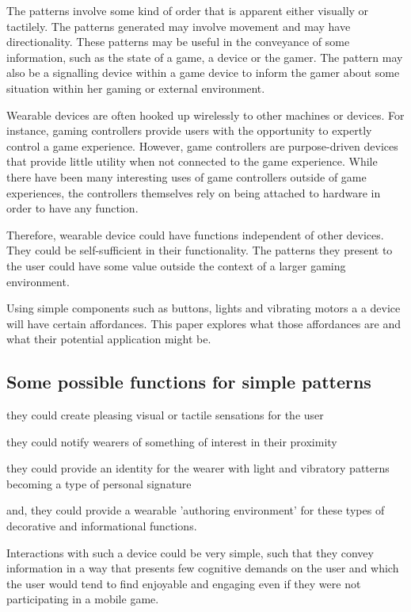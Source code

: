 \documentclass{chi-ext}
\begin{document}
The patterns involve some kind of order that is apparent either visually or tactilely. The patterns generated may involve movement and may have directionality. These patterns may be useful in the conveyance of some information, such as the state of a game, a device or the gamer. The pattern may also be a signalling device within a game device to inform the gamer about some situation within her gaming or external environment.

Wearable devices are often hooked up wirelessly to other machines or devices. For instance, gaming controllers provide users with the opportunity to expertly control a game experience. However, game controllers are purpose-driven devices that provide little utility when not connected to the game experience. While there have been many interesting uses of game controllers outside of game experiences, the controllers themselves rely on being attached to hardware in order to have any function. 

Therefore, wearable device could have functions independent of other devices. They could be self-sufficient in their functionality. The patterns they present to the user could have some value outside the context of a larger gaming environment. 

Using simple components such as buttons, lights and vibrating motors a a device will have certain affordances. This paper explores what those affordances are and what their potential application might be. 

\subsection{Some possible functions for simple patterns}
\begin{inparaenum}
\item they could create pleasing visual or tactile sensations for the user
\item they could notify wearers of something of interest in their proximity
\item they could provide an identity for the wearer with light and vibratory patterns becoming a type of personal signature
\item and, they could provide a wearable 'authoring environment' for these types of decorative and informational functions. 
\end{inparaenum}

Interactions with such a device could be very simple, such that they convey information in a way that presents few cognitive demands on the user and which the user would tend to find enjoyable and engaging even if they were not participating in a mobile game. 
\end{document}
